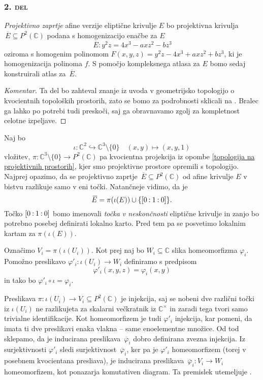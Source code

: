 \documentclass[mat1]{fmfdelo}
\newcommand{\C}{\mathbb C}
\newcommand{\CM}{\mathbb C ^\times}
\newcommand{\PC}{P^2(\mathbb C)}
\newcommand{\pcoor}[1]{%
\begingroup\lccode`~=`: \lowercase{\endgroup
\edef~}{\mathbin{\mathchar\the\mathcode`:}\nobreak}%
\left[%
\begingroup
\mathcode`:=\string"8000
#1%
\endgroup
\right]%
}
\newcommand{\olsi}[1]{\,\overline{\!{#1}}} %
\theoremstyle{definition}
\newenvironment{komentar}[1][Komentar]{\begin{proof}[#1]\let\qed\relax}{\end{proof}}
\begin{document}
\subsubsection*{\textsc{2. del}} \emph{Projektivno zaprtje} afine verzije eliptične krivulje $E$ bo projektivna krivulja $\olsi{E} \subseteq \PC$ podana s homogenizacijo enačbe za $E$
\[
    \olsi{E} : y^2z = 4x^3 - axz^2 - bz^3  
\]
oziroma s homogenim polinomom $F(x,y,z) = y^2z - 4x^3 + axz^2 + bz^3$, ki je homogenizacija polinoma $f$. S pomočjo kompleksnega atlasa za $E$ bomo sedaj konstruirali atlas za $\olsi{E}$. 

\begin{komentar}
    Ta del bo zahteval znanje iz uvoda v geometrijsko topologijo o kvocientnih topoloških prostorih, zato se bomo za podrobnosti sklicali na \cite[poglavje 3.2.]{MrcunTop}. Bralec ga lahko po potrebi tudi preskoči, saj ga obravnavamo zgolj za kompletnost celotne izpeljave. 
\end{komentar}

Naj bo 
\[
    \iota: \C^2 \hookrightarrow \C^3\setminus\{0\} \quad (x,y) \mapsto (x,y,1)
\]
vložitev, $\pi : \C^3 \setminus \{0\} \to \PC$ pa kvocientna projekcija iz opombe \ref{topologija na projektivnih prostorih}, kjer smo projektivne prostore opremili s topologijo. Najprej opazimo, da se projektivno zaprtje $\olsi{E} \subseteq \PC$ od afine krivulje $E$ v bistvu razlikuje samo v eni točki. Natančneje vidimo, da je 
\[
    \olsi{E} = \pi(\iota(E)) \cup \{\pcoor{0 : 1 : 0}\}.
\] 
Točko $\pcoor{0 : 1 : 0}$ bomo imenovali \emph{točka v neskončnosti} eliptične krivulje in zanjo bo potrebno posebej definirati lokalno karto. Pred tem pa se posvetimo lokalnim kartam za $\pi(\iota(E))$.

Označimo $V_i = \pi(\iota(U_i))$. Kot prej naj bo $W_i \subseteq \C$ slika homeomorfizma $\varphi_i$. Pomožno preslikavo $\varphi'_i : \iota(U_i) \to W_i$ definiramo s predpisom 
\[
    \varphi'_i(x,y,z) = \varphi_i(x,y)
\]
in tako bo $\varphi'_i \circ \iota = \varphi_i$.

Preslikava $\pi: \iota(U_i) \to V_i \subseteq \PC$ je injekcija, saj se nobeni dve različni točki iz $\iota(U_i)$ ne razlikujeta za skalarni večkratnik iz $\CM$ in zaradi tega tvori samo trivialne identifikacije. Kot homeomorfizem je tudi $\varphi'_i$ injekcija, kar pomeni, da imata ti dve preslikavi enaka vlakna -- same enoelementne množice. Od tod sklepamo, da je inducirana preslikava $\olsi{\varphi}_i$ dobro definirana zvezna injekcija. Iz surjektivnosti $\varphi'_i$ sledi surjektivnost $\olsi{\varphi}_i$, ker pa je $\varphi'_i$ homeomorfizem (torej v posebnem kvocientana presliava), je inducirana preslikava $\olsi{\varphi}_i : V_i \to W_i$ homeomorfizem, kot ponazarja komutativen diagram. Ta premislek utemeljuje \cite[Posledica 3.23]{MrcunTop}.
\end{document}
